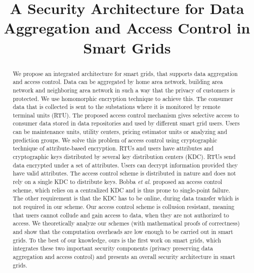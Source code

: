 \documentclass[conference]{IEEEtran}[10pt]
\begin{document}
\title{A Security Architecture for Data Aggregation  and Access Control in Smart Grids}


\author{
}

\maketitle{}

\begin{abstract}
We propose an integrated architecture for smart grids, that supports data aggregation  and access control.
Data can be aggregated by home area network, building area network and neighboring area network in such a way that the privacy of customers is protected.
We use homomorphic encryption technique to achieve this.
The consumer data that is collected is sent to the substations where it is monitored by remote terminal units (RTU).
The proposed access control mechanism
gives selective access to  consumer data
stored in data repositories and used by different smart grid users.
Users can be
maintenance units, utility centers, pricing estimator units or analyzing and prediction groups. 
We solve this problem of access control using cryptographic technique of attribute-based encryption.
RTUs  and  users have attributes and cryptographic keys distributed by several key distribution centers (KDC).
RTUs send data encrypted under a set of attributes.
Users can decrypt information provided they have valid attributes.
The access control scheme is distributed in nature and does not rely on a single KDC to distribute keys.
Bobba \emph{et al.} \cite{BKAA09} proposed an access control scheme, which relies on a centralized KDC and is thus prone to single-point failure.
The other requirement is that the KDC has to be online, during data transfer which is not required in our scheme.
Our access control scheme is collusion resistant, meaning that users cannot collude and gain access to data, when they are not authorized to access.
We theoretically analyze our schemes (with mathematical proofs of correctness) and
show that the computation overheads are low enough to be carried out in smart grids.
To the best of our knowledge, ours is the first work on smart grids, which integrates these two important security components (privacy preserving
data aggregation and access control) and presents an overall security architecture in smart grids.

\end{abstract}
\end{document}
